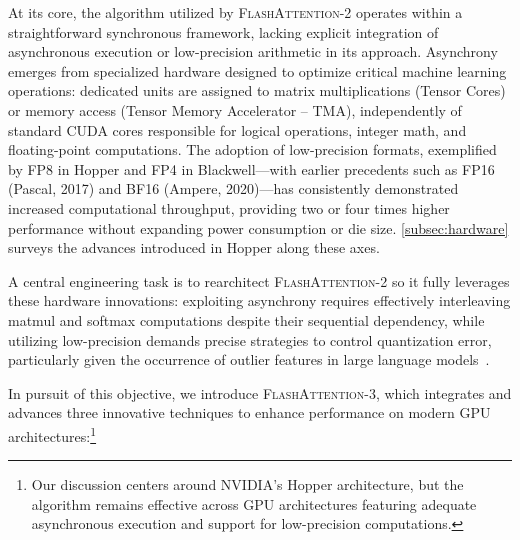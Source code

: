 At its core, the algorithm utilized by \textsc{FlashAttention-2} operates within a straightforward synchronous framework, lacking explicit integration of asynchronous execution or low-precision arithmetic in its approach. Asynchrony emerges from specialized hardware designed to optimize critical machine learning operations: dedicated units are assigned to matrix multiplications (Tensor Cores) or memory access (Tensor Memory Accelerator -- TMA), independently of standard CUDA cores responsible for logical operations, integer math, and floating-point computations. The adoption of low-precision formats, exemplified by FP8 in Hopper and FP4 in Blackwell—with earlier precedents such as FP16 (Pascal, 2017) and BF16 (Ampere, 2020)—has consistently demonstrated increased computational throughput, providing two or four times higher performance without expanding power consumption or die size. \cref{subsec:hardware} surveys the advances introduced in Hopper along these axes.

A central engineering task is to rearchitect \textsc{FlashAttention-2} so it fully leverages these hardware innovations: exploiting asynchrony requires effectively interleaving matmul and softmax computations despite their sequential dependency, while utilizing low-precision demands precise strategies to control quantization error, particularly given the occurrence of outlier features in large language models~\citep{dettmers2208llm, sun2024massive}.

In pursuit of this objective, we introduce \textsc{FlashAttention-3}, which integrates and advances three innovative techniques to enhance performance on modern GPU architectures:\footnote{Our discussion centers around NVIDIA's Hopper architecture, but the algorithm remains effective across GPU architectures featuring adequate asynchronous execution and support for low-precision computations.}

